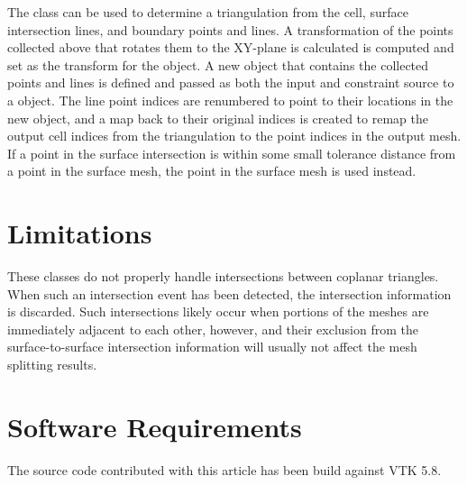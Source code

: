 \documentclass{InsightArticle}
\begin{document}
The  class can be used to determine a triangulation from the cell, surface intersection lines, and boundary points and lines. A transformation of the points collected above that rotates them to the XY-plane is calculated is computed and set as the transform for the  object. A new  object that contains the collected points and lines is defined and passed as both the input and constraint source to a  object. The line point indices are renumbered to point to their locations in the new  object, and a map back to their original indices is created to remap the output cell indices from the triangulation to the point indices in the output mesh. If a point in the surface intersection is within some small tolerance distance from a point in the surface mesh, the point in the surface mesh is used instead.

\section{Limitations}

These classes do not properly handle intersections between coplanar triangles. When such an intersection event has been detected, the intersection information is discarded. Such intersections likely occur when portions of the meshes are immediately adjacent to each other, however, and their exclusion from the surface-to-surface intersection information will usually not affect the mesh splitting results.

\section{Software Requirements}

The source code contributed with this article has been build against VTK 5.8.

%
%

\begin{figure}
\center
\label{fig:RegistrationComponents}
\end{figure}



%
%



\end{document}

